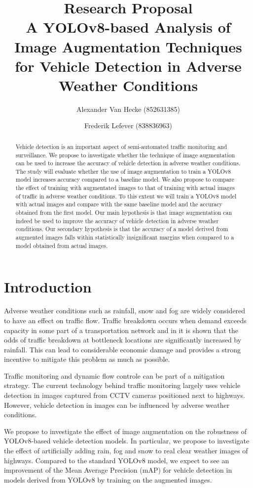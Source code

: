\documentclass[]{article}
\title{Research Proposal \\
	A YOLOv8-based Analysis of Image Augmentation Techniques for Vehicle Detection in Adverse Weather Conditions}
\author{
		Alexander Van Hecke \small(852631385) \and 
		Frederik Lefever    \small(838836963)}
\begin{document}
\maketitle

\begin{abstract}
	Vehicle detection is an important aspect of semi-automated traffic monitoring and surveillance.  We propose to investigate whether the technique of image augmentation can be used to increase the accuracy of vehicle detection in adverse weather conditions.  The study will evaluate whether the use of image augmentation to train a YOLO\small{v8} model increases accuracy compared to a baseline model.  We also propose to compare the effect of training with augmentated images to that of training with actual images of traffic in adverse weather conditions. To this extent we will train a YOLO\small{v8} model with actual images and compare with the same baseline model and the accuracy obtained from the first model. Our main hypothesis is that image augmentation can indeed be used to improve the accuracy of vehicle detection in adverse weather conditions. Our secondary hypothesis is that the accuracy of a model derived from augmented images falls within statistically insignificant margins when compared to a model obtained from actual images.  
\end{abstract}

\section{Introduction}

	Adverse weather conditions such as rainfall, snow and fog are widely considered to have an effect on traffic flow. Traffic breakdown occurs when demand exceeds capacity in some part of a transportation network and in \cite{stralenInfluenceAdverseWeather2015} it is shown that the odds of traffic breakdown at bottleneck locations are significantly increased by rainfall.  This can lead to considerable economic damage and provides a strong incentive to mitigate this problem as much as possible.
	
	Traffic monitoring and dynamic flow controle can be part of a mitigation strategy. The current technology behind traffic monitoring largely uses vehicle detection in images captured from CCTV cameras positioned next to highways. However, vehicle detection in images can be influenced by adverse weather conditions.
	
	We propose to investigate the effect of image augmentation on the robustness of YOLO{\small v8}-based vehicle detection models. In particular, we propose to investigate the effect of artificially adding rain, fog and snow to real clear weather images of highways. Compared to the standard YOLO{\small v8} model, we expect to see an improvement of the Mean Average Precision (mAP) for vehicle detection in models derived from YOLO{\small v8} by training on the augmented images.
	
\end{document}
